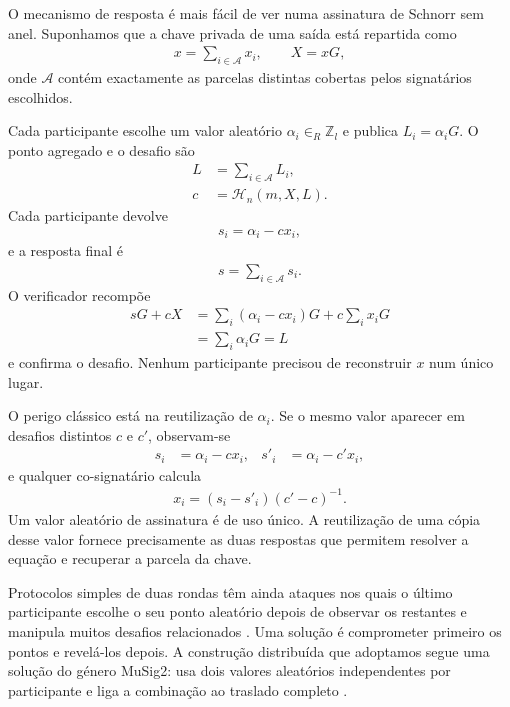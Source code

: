O mecanismo de resposta é mais fácil de ver numa assinatura de Schnorr sem
anel. Suponhamos que a chave privada de uma saída está repartida como
\begin{align*}
 x=\sum_{i\in\mathcal A}x_i,
 \qquad X=xG,
\end{align*}
onde \(\mathcal A\) contém exactamente as parcelas distintas cobertas pelos
signatários escolhidos.

Cada participante escolhe um valor aleatório
\(\alpha_i\in_R\mathbb Z_l\) e publica \(L_i=\alpha_iG\). O ponto agregado e o
desafio são
\begin{align*}
 L&=\sum_{i\in\mathcal A}L_i,\\
 c&=\mathcal H_n(m,X,L).
\end{align*}
Cada participante devolve
\begin{align*}
 s_i=\alpha_i-cx_i,
\end{align*}
e a resposta final é
\begin{align*}
 s=\sum_{i\in\mathcal A}s_i.
\end{align*}
O verificador recompõe
\begin{align*}
 sG+cX
 &=\sum_i(\alpha_i-cx_i)G+c\sum_ix_iG\\
 &=\sum_i\alpha_iG=L
\end{align*}
e confirma o desafio. Nenhum participante precisou de reconstruir \(x\) num
único lugar.

O perigo clássico está na reutilização de \(\alpha_i\). Se o mesmo valor
aparecer em desafios distintos \(c\) e \(c'\), observam-se
\begin{align*}
 s_i&=\alpha_i-cx_i, &
 s'_i&=\alpha_i-c'x_i,
\end{align*}
e qualquer co-signatário calcula
\begin{align*}
 x_i=(s_i-s'_i)(c'-c)^{-1}.
\end{align*}
Um valor aleatório de assinatura é de uso único. A reutilização de uma
cópia desse valor fornece precisamente as duas respostas que permitem
resolver a equação e recuperar a parcela da chave.

Protocolos simples de duas rondas têm ainda ataques nos quais o último
participante escolhe o seu ponto aleatório depois de observar os restantes e
manipula muitos desafios relacionados \cite{cryptoeprint:2018:417}. Uma
solução é comprometer primeiro os pontos e revelá-los depois. A construção
distribuída que adoptamos segue uma solução do género MuSig2: usa dois valores
aleatórios independentes por participante e liga a combinação ao traslado
completo \cite{musig2}.

